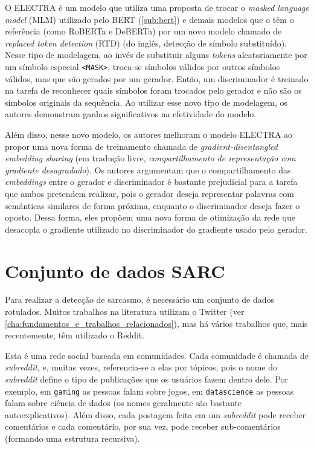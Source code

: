 O ELECTRA é um modelo que utiliza uma proposta de trocar o \textit{masked
language model} (MLM) utilizado pelo BERT (\ref{sub:bert}) e demais modelos que
o têm o referência (como RoBERTa e DeBERTa) por um novo modelo chamado de
\textit{replaced token detection} (RTD) (do inglês, detecção de símbolo
substituído). Nesse tipo de modelagem, ao invés de substituir alguns
\textit{tokens} aleatoriamente por um símbolo especial \texttt{<MASK>}, troca-se
símbolos válidos por outros símbolos válidos, mas que são gerados por um
gerador. Então, um discriminador é treinado na tarefa de reconhecer quais
símbolos foram trocados pelo gerador e não são os símbolos originais da
sequência. Ao utilizar esse novo tipo de modelagem, os autores demonstram ganhos
significativos na efetividade do modelo.

Além disso, nesse novo modelo, os autores melhoram o modelo ELECTRA ao propor
uma nova forma de treinamento chamada de \textit{gradient-disentangled embedding
sharing} (em tradução livre, \textit{compartilhamento de representação com
gradiente desagradado}). Os autores argumentam que o compartilhamento das
\textit{embeddings} entre o gerador e discriminador é bastante prejudicial para
a tarefa que ambos pretendem realizar, pois o gerador deseja representar
palavras com semânticas similares de forma próxima, enquanto o discriminador
deseja fazer o oposto. Dessa forma, eles propõem uma nova forma de otimização da
rede que desacopla o gradiente utilizado no discriminador do gradiente usado
pelo gerador.

\section{Conjunto de dados SARC}%
\label{sec:conjunto_de_dados_sarc}

Para realizar a detecção de sarcasmo, é necessário um conjunto de dados
rotulados. Muitos trabalhos na literatura utilizam o Twitter (ver
\ref{cha:fundamentos_e_trabalhos_relacionados}), mas há vários trabalhos que,
mais recentemente, têm utilizado o Reddit.

Esta é uma rede social baseada em comunidades. Cada comunidade é chamada de
\textit{subreddit}, e, muitas vezes, referencia-se a elas por tópicos, pois o
nome do \textit{subreddit} define o tipo de publicações que os usuários fazem
dentro dele. Por exemplo, em \texttt{gaming} as pessoas falam sobre jogos, em
\texttt{datascience} as pessoas falam sobre ciência de dados (os nomes
geralmente são bastante autoexplicativos). Além disso, cada postagem feita em um
\textit{subreddit} pode receber comentários e cada comentário, por sua vez, pode
receber sub-comentários (formando uma estrutura recursiva).

